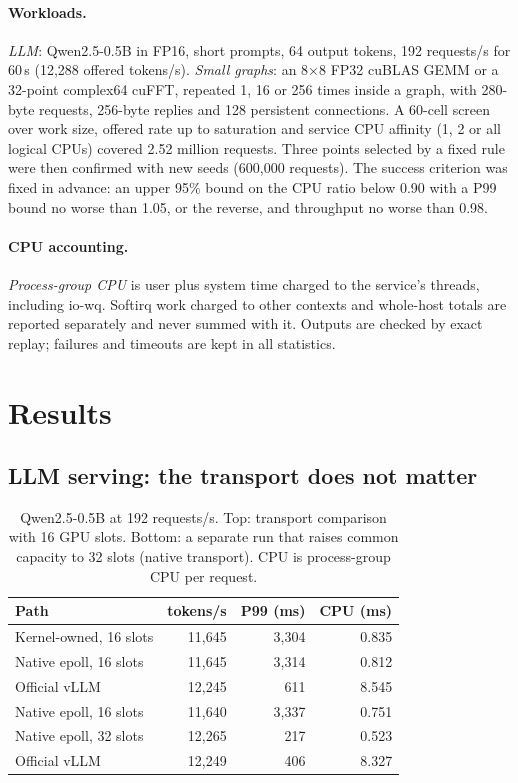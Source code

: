 \documentclass[sigconf,nonacm]{acmart}
\begin{document}
\paragraph{Workloads.} \emph{LLM}: Qwen2.5-0.5B in FP16, short prompts, 64
output tokens, 192 requests/s for 60\,s (12,288 offered tokens/s).
\emph{Small graphs}: an 8$\times$8 FP32 cuBLAS GEMM or a 32-point complex64
cuFFT, repeated 1, 16 or 256 times inside a graph, with 280-byte requests,
256-byte replies and 128 persistent connections. A 60-cell screen over work
size, offered rate up to saturation and service CPU affinity (1, 2 or all
logical CPUs) covered 2.52 million requests. Three points selected by a fixed
rule were then confirmed with new seeds (600,000 requests). The success
criterion was fixed in advance: an upper 95\% bound on the CPU ratio below 0.90
with a P99 bound no worse than 1.05, or the reverse, and throughput no worse
than 0.98.

\paragraph{CPU accounting.} \emph{Process-group CPU} is user plus system time
charged to the service's threads, including io-wq. Softirq work charged to
other contexts and whole-host totals are reported separately and never summed
with it. Outputs are checked by exact replay; failures and timeouts are kept in
all statistics.

\section{Results}
\label{sec:results}

\subsection{LLM serving: the transport does not matter}

\begin{table}[t]
\centering
\small
\caption{Qwen2.5-0.5B at 192 requests/s. Top: transport comparison with 16 GPU
slots. Bottom: a separate run that raises common capacity to 32 slots
(native transport). CPU is process-group CPU per request.}
\label{tab:llm}
\begin{tabular}{lrrr}
\toprule
Path & tokens/s & P99 (ms) & CPU (ms) \\
\midrule
Kernel-owned, 16 slots & 11,645 & 3,304 & 0.835 \\
Native epoll, 16 slots & 11,645 & 3,314 & 0.812 \\
Official vLLM & 12,245 & 611 & 8.545 \\
\midrule
Native epoll, 16 slots & 11,640 & 3,337 & 0.751 \\
Native epoll, 32 slots & 12,265 & 217 & 0.523 \\
Official vLLM & 12,249 & 406 & 8.327 \\
\bottomrule
\end{tabular}
\end{table}
\end{document}
